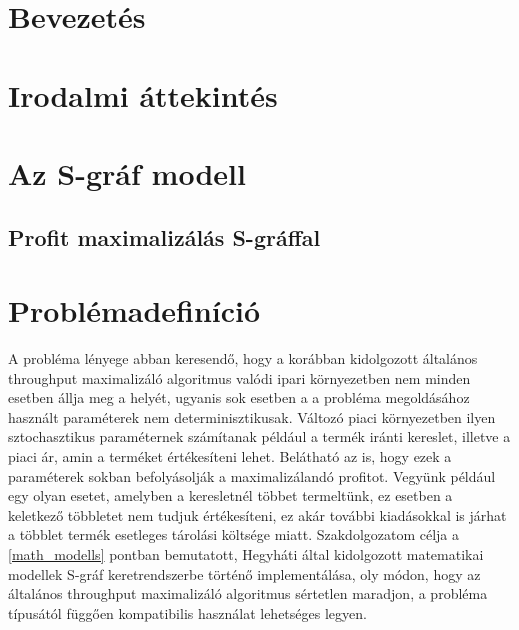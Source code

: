 \documentclass [12pt]{report}
\begin{document}

\tableofcontents
\thispagestyle{empty}

\chapter{Bevezetés}
\setcounter{page}{1}
\chapter{Irodalmi áttekintés}
\chapter{Az S-gráf modell}
\section{Profit maximalizálás S-gráffal}
\chapter{Problémadefiníció}
A probléma lényege abban keresendő, hogy a korábban kidolgozott általános throughput maximalizáló algoritmus \cite{?} valódi ipari környezetben nem minden esetben állja meg a helyét, ugyanis sok esetben a a probléma megoldásához használt paraméterek nem determinisztikusak. Változó piaci környezetben ilyen sztochasztikus paraméternek számítanak például a termék iránti kereslet, illetve a piaci ár, amin a terméket értékesíteni lehet. Belátható az is, hogy ezek a paraméterek sokban befolyásolják a maximalizálandó profitot. Vegyünk például egy olyan esetet, amelyben a keresletnél többet termeltünk, ez esetben a keletkező többletet nem tudjuk értékesíteni, ez akár további kiadásokkal is járhat a többlet termék esetleges tárolási költsége miatt. Szakdolgozatom célja a \ref{math_modells} pontban bemutatott, Hegyháti által kidolgozott \cite{?} matematikai modellek S-gráf keretrendszerbe történő implementálása, oly módon, hogy az általános throughput maximalizáló algoritmus sértetlen maradjon, a probléma típusától függően kompatibilis használat lehetséges legyen.
\end{document}
